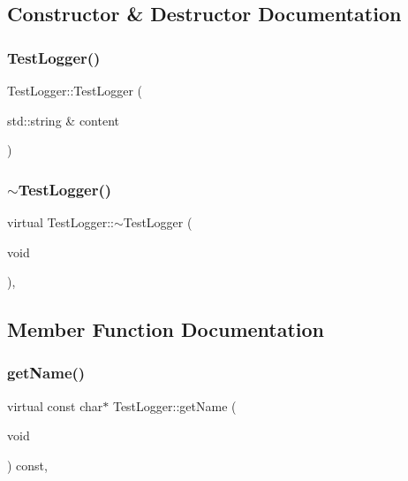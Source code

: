\subsection{Constructor \& Destructor Documentation}
\mbox{\label{class_test_logger_a001a08d4352b92db12ba738668c00acc}} 
\subsubsection{\texorpdfstring{TestLogger()}{TestLogger()}}
{\footnotesize\ttfamily Test\+Logger\+::\+Test\+Logger (\begin{DoxyParamCaption}\item[{std\+::string \&}]{content }\end{DoxyParamCaption})\hspace{0.3cm}{\ttfamily [inline]}}

\mbox{\label{class_test_logger_a15d754f02edaf2ccc77d647864d02603}} 
\subsubsection{\texorpdfstring{$\sim$TestLogger()}{~TestLogger()}}
{\footnotesize\ttfamily virtual Test\+Logger\+::$\sim$\+Test\+Logger (\begin{DoxyParamCaption}\item[{void}]{ }\end{DoxyParamCaption})\hspace{0.3cm}{\ttfamily [virtual]}, {\ttfamily [default]}}



\subsection{Member Function Documentation}
\mbox{\label{class_test_logger_a4e3ad3222ab7495cf30bb5b1a5270795}} 
\subsubsection{\texorpdfstring{getName()}{getName()}}
{\footnotesize\ttfamily virtual const char$\ast$ Test\+Logger\+::get\+Name (\begin{DoxyParamCaption}\item[{void}]{ }\end{DoxyParamCaption}) const\hspace{0.3cm}{\ttfamily [inline]}, {\ttfamily [virtual]}}




